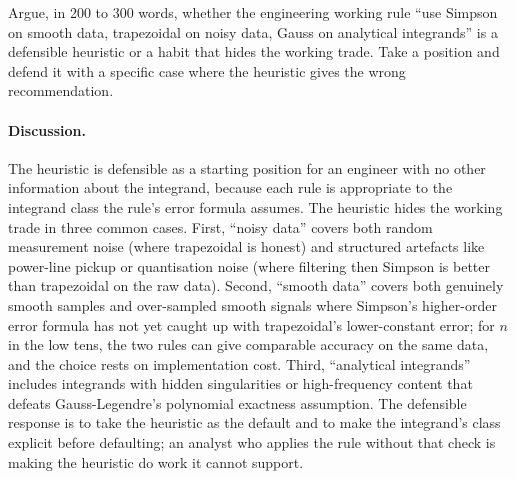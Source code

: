 \begin{exercise}
Argue, in 200 to 300 words, whether the engineering working rule
``use Simpson on smooth data, trapezoidal on noisy data, Gauss on
analytical integrands'' is a defensible heuristic or a habit that
hides the working trade. Take a position and defend it with a
specific case where the heuristic gives the wrong recommendation.
\end{exercise}

\paragraph{Discussion.}
The heuristic is defensible as a starting position for an
engineer with no other information about the integrand, because
each rule is appropriate to the integrand class the rule's error
formula assumes. The heuristic hides the working trade in three
common cases. First, ``noisy data'' covers both random
measurement noise (where trapezoidal is honest) and structured
artefacts like power-line pickup or quantisation noise (where
filtering then Simpson is better than trapezoidal on the raw
data). Second, ``smooth data'' covers both genuinely smooth
samples and over-sampled smooth signals where Simpson's
higher-order error formula has not yet caught up with
trapezoidal's lower-constant error; for $n$ in the low tens, the
two rules can give comparable accuracy on the same data, and the
choice rests on implementation cost. Third, ``analytical
integrands'' includes integrands with hidden singularities or
high-frequency content that defeats Gauss-Legendre's polynomial
exactness assumption. The defensible response is to take the
heuristic as the default and to make the integrand's class
explicit before defaulting; an analyst who applies the rule
without that check is making the heuristic do work it cannot
support.
